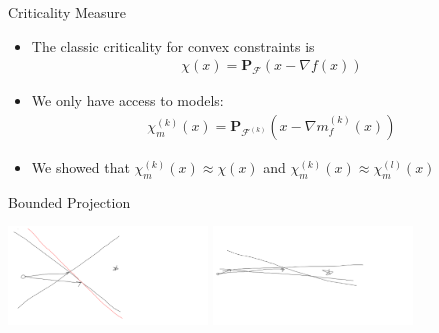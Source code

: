 \documentclass{beamer}
\newcommand{\feasible}{\mathcal F}
\newcommand{\feasiblek}{\mathcal F^{(k)}}
\newcommand{\proj}{\textbf{P}}
\begin{document}
\begin{frame}{Criticality Measure}
	\begin{itemize}
		\item The classic criticality for convex constraints is
\begin{align*}
\chi(x) = \proj_{\feasible}\left(x - \nabla f(x)\right)
\end{align*}
		\item We only have access to models:
\begin{align*}
\chi_m^{(k)}(x) = \proj_{\feasiblek}\left(x - \nabla m_f^{(k)}(x)\right)
\end{align*}
		\item We showed that $\chi_m^{(k)}(x) \approx \chi(x)$ and $\chi_m^{(k)}(x) \approx \chi_m^{(l)}(x)$
	\end{itemize}
\end{frame}




\begin{frame}{Bounded Projection}
	\begin{center}
		\includegraphics[width=200px]{images/projection_good.png}
		\includegraphics[width=200px]{images/projection_bad.png}
	\end{center}
\end{frame}
\end{document}
